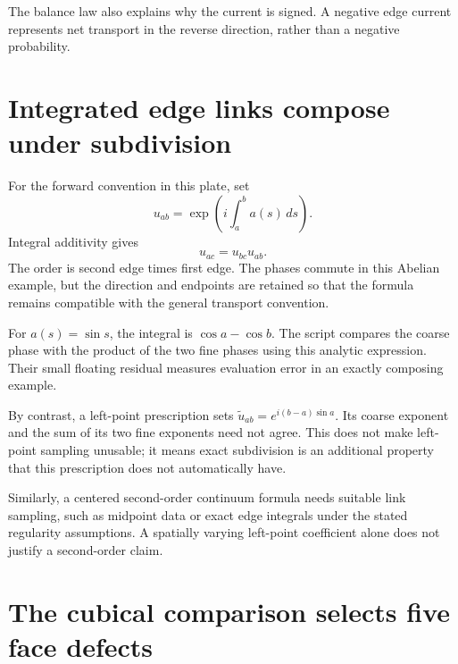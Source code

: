 The balance law also explains why the current is signed. A negative edge current represents net transport in the reverse direction, rather than a negative probability.



\clearpage
\section{Integrated edge links compose under subdivision}

For the forward convention in this plate, set
\[
u_{ab}=\exp\!\left(i\int_a^b a(s)\,ds\right).
\]
Integral additivity gives
\[
u_{ac}=u_{bc}u_{ab}.
\]
The order is second edge times first edge. The phases commute in this Abelian example, but the direction and endpoints are retained so that the formula remains compatible with the general transport convention.

For $a(s)=\sin s$, the integral is $\cos a-\cos b$. The script compares the coarse phase with the product of the two fine phases using this analytic expression. Their small floating residual measures evaluation error in an exactly composing example.

By contrast, a left-point prescription sets $\widetilde u_{ab}=e^{i(b-a)\sin a}$. Its coarse exponent and the sum of its two fine exponents need not agree. This does not make left-point sampling unusable; it means exact subdivision is an additional property that this prescription does not automatically have.

Similarly, a centered second-order continuum formula needs suitable link sampling, such as midpoint data or exact edge integrals under the stated regularity assumptions. A spatially varying left-point coefficient alone does not justify a second-order claim.



\clearpage
\section{The cubical comparison selects five face defects}

